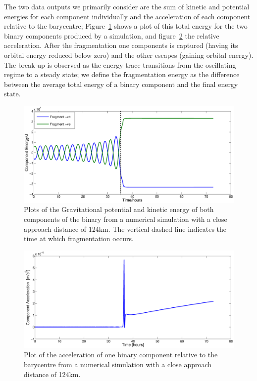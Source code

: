 \documentclass[letterpaper, preprint, paper,11pt]{AAS}	%
\begin{document}
The two data outputs we primarily consider are the sum of kinetic and potential energies for each component individually and the acceleration of each component relative to the barycentre;  Figure~\ref{fig:Num_energy} shows a plot of this total energy for the two binary components produced by a simulation, and  figure~\ref{fig:Num_accell} the relative acceleration. After the fragmentation one components is captured (having its orbital energy reduced below zero) and the other escapes (gaining orbital energy). The break-up is observed as the energy trace transitions from the oscillating regime to a steady state; we define the fragmentation energy as the difference between the average total energy of a binary component and the final energy state.
\begin{figure}[H]
\centering
\centerline{\includegraphics[width=1.2\textwidth]{binary_num.eps}} 
\caption{Plots of the Gravitational potential and kinetic energy of both components of the binary from a numerical simulation with a close approach distance of 124km. The vertical dashed line indicates the time at which fragmentation occurs.} 
\label{fig:Num_energy}
\end{figure}
 \begin{figure}[H]
\centering
\centerline{\includegraphics[width=1.2\textwidth]{peak_accel.eps}} 
\caption{Plot of the acceleration of one binary component relative to the barycentre from a numerical simulation
 with a close approach distance of 124km.} 
\label{fig:Num_accell}
\end{figure}
\end{document}
